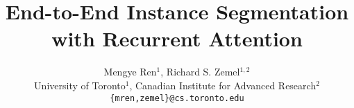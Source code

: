 \documentclass[10pt,twocolumn,letterpaper]{article}
\renewcommand{\*}[1]{\textbf{#1}}               %
\begin{document}
\title{End-to-End Instance Segmentation with Recurrent Attention}

\author{
    Mengye Ren${}^1$, Richard S. Zemel${}^{1,2}$ \\
    University of Toronto${}^1$, Canadian Institute for Advanced Research${}^2$ \\
    {\tt \small \{mren,zemel\}@cs.toronto.edu} \\
}

\maketitle









\end{document}
